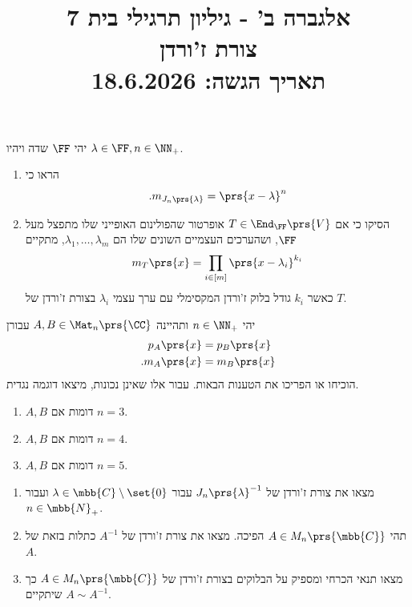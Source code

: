\documentclass[a4paper,10pt,twoside,openany]{article}
\title{
אלגברה ב' - גיליון תרגילי בית 7 \\
צורת ז'ורדן
\\
\vspace{1cm}
\large{תאריך הגשה: 18.6.2026}
}
\date{}
\begin{document}
\maketitle

\begin{exercise} %
יהי
$\FF$
שדה ויהיו
$\lambda \in \FF, n \in \NN_+$.
\begin{enumerate}
\item
 הראו כי
\[\text{.} m_{J_n\prs{\lambda}} = \prs{x - \lambda}^n\]

\item הסיקו כי אם
$T \in \End_\FF\prs{V}$
אופרטור שהפולינום האופייני שלו מתפצל מעל
$\FF$,
ושהערכים העצמיים השונים שלו הם
$\lambda_1, \ldots, \lambda_m$,
מתקיים
\begin{align*}
m_T\prs{x} = \prod_{i \in [m]} \prs{x - \lambda_i}^{k_i}
\end{align*}
כאשר
$k_i$
גודל בלוק ז'ורדן המקסימלי עם ערך עצמי
$\lambda_i$
בצורת ז'ורדן של
$T$.
\end{enumerate}
\end{exercise}

\begin{exercise} %
יהי
$n \in \NN_+$
ותהיינה
$A,B \in \Mat_n\prs{\CC}$
עבורן
\begin{align*}
p_A\prs{x} &= p_B\prs{x} \\
\text{.} m_A\prs{x} &= m_B\prs{x}
\end{align*}
הוכיחו או הפריכו את הטענות הבאות. עבור אלו שאינן נכונות, מיצאו דוגמה נגדית.

\begin{enumerate}
\item
$A,B$
דומות אם
$n=3$.

\item
$A,B$
דומות אם
$n=4$.

\item
$A,B$
דומות אם
$n=5$.
\end{enumerate}
\end{exercise}

\begin{exercise}%
\begin{enumerate}
\item מצאו את צורת ז'ורדן של
$J_n\prs{\lambda}^{-1}$
עבור
$\lambda \in \mbb{C}\setminus\set{0}$
ועבור
$n \in \mbb{N}_+$.

\item תהי
$A \in M_n\prs{\mbb{C}}$
הפיכה.
מצאו את צורת ז'ורדן של
$A^{-1}$
כתלות בזאת של
$A$.

\item מצאו תנאי הכרחי ומספיק על הבלוקים בצורת ז'ורדן של
$A \in M_n\prs{\mbb{C}}$
כך שיתקיים
$A \sim A^{-1}$.
\end{enumerate}
\end{exercise}
\end{document}
